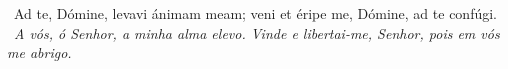 \begin{paracol}{2}
  \Antiphona~Ad te, Dómine, levavi ánimam meam; veni et éripe me, Dómine, ad te confúgi.
  \switchcolumn
  \Antiphona~\emph{A vós, ó Senhor, a minha alma elevo. Vinde e libertai-me, Senhor, pois em vós me abrigo.}
\end{paracol}